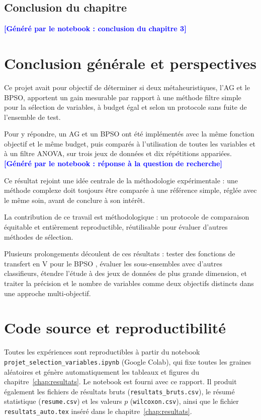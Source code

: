 \documentclass[11pt,a4paper]{report}
\newcommand{\attente}[1]{\textcolor{blue}{\textbf{[Généré par le notebook : #1]}}}
\newcommand{\ReponseQuestion}{\attente{réponse à la question de recherche}}
\newcommand{\ConclusionChapitre}{\attente{conclusion du chapitre 3}}
\begin{document}
\section{Conclusion du chapitre}
\ConclusionChapitre

\chapter*{Conclusion générale et perspectives}
Ce projet avait pour objectif de déterminer si deux métaheuristiques, l'AG et le BPSO, apportent
un gain mesurable par rapport à une méthode filtre simple pour la sélection de variables, à budget
égal et selon un protocole sans fuite de l'ensemble de test.

Pour y répondre, un AG et un BPSO ont été implémentés avec la même fonction objectif et le même
budget, puis comparés à l'utilisation de toutes les variables et à un filtre ANOVA, sur trois
jeux de données et dix répétitions appariées. \ReponseQuestion

Ce résultat rejoint une idée centrale de la méthodologie expérimentale : une méthode complexe
doit toujours être comparée à une référence simple, réglée avec le même soin, avant de conclure
à son intérêt.

La contribution de ce travail est méthodologique : un protocole de comparaison équitable et
entièrement reproductible, réutilisable pour évaluer d'autres méthodes de sélection.

Plusieurs prolongements découlent de ces résultats : tester des fonctions de transfert en V pour
le BPSO \cite{mirjalili2013}, évaluer les sous-ensembles avec d'autres classifieurs, étendre
l'étude à des jeux de données de plus grande dimension, et traiter la précision et le nombre de
variables comme deux objectifs distincts dans une approche multi-objectif.

\printbibliography[heading=bibintoc, title={Références}]

\appendix

\chapter{Code source et reproductibilité}
\label{ann:code}
\sloppy
Toutes les expériences sont reproductibles à partir du notebook
\texttt{projet\_selection\_variables.ipynb} (Google Colab), qui fixe toutes les graines
aléatoires et génère automatiquement les tableaux et figures du chapitre~\ref{chap:resultats}.
Le notebook est fourni avec ce rapport. Il produit également les fichiers de résultats bruts
(\texttt{resultats\_bruts.csv}), le résumé statistique (\texttt{resume.csv}) et les valeurs $p$
(\texttt{wilcoxon.csv}), ainsi que le fichier \texttt{resultats\_auto.tex} inséré dans le
chapitre~\ref{chap:resultats}.
\end{document}

